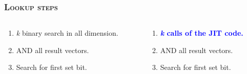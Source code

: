 \documentclass[xcolor=x11names,compress]{beamer}
\renewcommand{\(}{\begin{columns}}
\renewcommand{\)}{\end{columns}}
\newcommand{\<}[1]{\begin{column}{#1}}
\renewcommand{\>}{\end{column}}
\begin{document}
\begin{frame}
  \frametitle{\scshape Lookup steps}
  \begin{columns}[T] %
    \begin{column}{.48\textwidth}
    \begin{tcolorbox}[colback=red!5!white,colframe=red!75!black,title=Standard bitvector,drop fuzzy shadow]
    \begin{enumerate}[label=\arabic*)]%
      \item \textit{k} binary search in all dimension.
      \item AND all result vectors.
      \item Search for first set bit.
    \end{enumerate}
    \end{tcolorbox}
    \end{column}
    \hfill
    \begin{column}{.48\textwidth}
    \begin{tcolorbox}[colback=blue!5!white,colframe=blue!75!black,title=Bitvector with JIT,drop fuzzy shadow]
    \begin{enumerate}[label=\arabic*)]%
      \item \textcolor{blue}{\textbf{\textit{k} calls of the JIT code.}}
      \item AND all result vectors.
      \item Search for first set bit.
    \end{enumerate}
    \end{tcolorbox}
    \end{column}
  \end{columns}
\end{frame}
\end{document}
